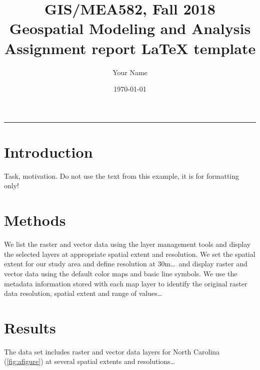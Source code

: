 \documentclass[10pt]{article}
\title{GIS/MEA582, Fall 2018 \\ Geospatial Modeling and Analysis \\ Assignment report \LaTeX{} template}
\author{Your Name}
\date{\today}
\begin{document}
\maketitle
\noindent
\rule{\textwidth}{1.5pt}

\pagestyle{fancy}


\section*{Introduction}

Task, motivation. Do not use the text from this example, it is for formatting only!

\section*{Methods}

We list the raster and vector data using the layer management tools and display
the selected layers at appropriate spatial extent and resolution.
We set the spatial extent for our study area and define resolution at 30m\ldots\ and
display raster and vector data using the default color maps and basic line symbols.
We use the metadata information stored with each map layer to identify
the original raster data resolution, spatial extent and range of values\ldots


\section*{Results}

The data set includes raster and vector data layers for North Carolina (\ref{fig:afigure})
at several spatial extents and resolutions\ldots
\end{document}
